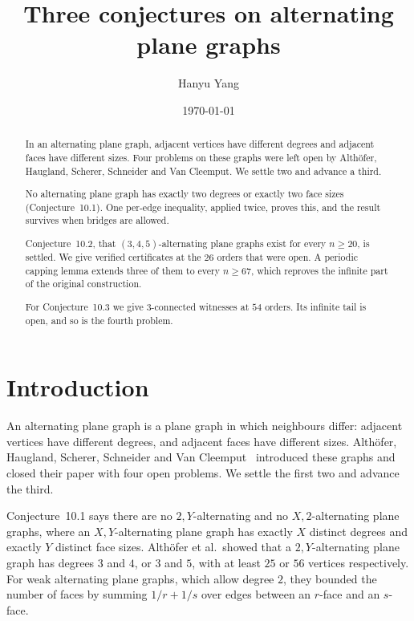 \documentclass[11pt,a4paper]{amsart}
\theoremstyle{plain}
\theoremstyle{definition}
\begin{document}
\title[Three conjectures on alternating plane graphs]
      {Three conjectures on alternating plane graphs}

\author{Hanyu Yang}

\date{\today}


\begin{abstract}
In an alternating plane graph, adjacent vertices have different degrees and
adjacent faces have different sizes. Four problems on these graphs were left
open by Alth\"ofer, Haugland, Scherer, Schneider and Van Cleemput. We settle two
and advance a third.

No alternating plane graph has exactly two degrees or exactly two face sizes
(Conjecture~10.1). One per-edge inequality, applied twice, proves this, and the
result survives when bridges are allowed.

Conjecture~10.2, that $(3,4,5)$-alternating plane graphs exist for every
$n \ge 20$, is settled. We give verified certificates at the $26$ orders that
were open. A periodic capping lemma extends three of them to every $n \ge 67$,
which reproves the infinite part of the original construction.

For Conjecture~10.3 we give $3$-connected witnesses at $54$ orders. Its
infinite tail is open, and so is the fourth problem.
\end{abstract}

\maketitle

\section{Introduction}

An alternating plane graph is a plane graph in which neighbours differ: adjacent
vertices have different degrees, and adjacent faces have different sizes.
Alth\"ofer, Haugland, Scherer, Schneider and Van Cleemput~\cite{AHSSV2015}
introduced these graphs and closed their paper with four open problems. We
settle the first two and advance the third.

Conjecture~10.1 says there are no $2,Y$-alternating and no $X,2$-alternating
plane graphs, where an $X,Y$-alternating plane graph has exactly $X$ distinct
degrees and exactly $Y$ distinct face sizes. Alth\"ofer et al.\ showed that a
$2,Y$-alternating plane graph has degrees $3$ and $4$, or $3$ and $5$, with at
least $25$ or $56$ vertices respectively. For weak
alternating plane graphs, which allow degree $2$, they bounded the number of
faces by summing $1/r+1/s$ over edges between an $r$-face and an $s$-face.
\end{document}
